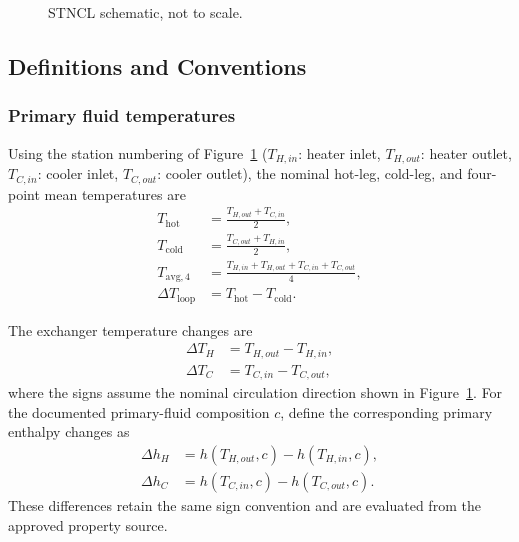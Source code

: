 \documentclass[11pt]{article}
\newcommand{\Tavg}{T_{\mathrm{avg},4}}
\newcommand{\Thot}{T_{\mathrm{hot}}}
\newcommand{\Tcold}{T_{\mathrm{cold}}}
\begin{document}
\begin{figure}[H]
\caption{STNCL schematic, not to scale.}
\label{fig:schematic}
\end{figure}

\subsection{Definitions and Conventions}

\subsubsection{Primary fluid temperatures}
\label{sec:def_temps}

Using the station numbering of Figure~\ref{fig:schematic} ($T_{H,in}$: heater inlet, $T_{H,out}$: heater outlet, $T_{C,in}$: cooler inlet, $T_{C,out}$: cooler outlet), the nominal hot-leg, cold-leg, and four-point mean temperatures are
\begin{align}
\Thot &= \frac{T_{H,out}+T_{C,in}}{2}, \\
\Tcold &= \frac{T_{C,out}+T_{H,in}}{2}, \\
\Tavg &= \frac{T_{H,in}+T_{H,out}+T_{C,in}+T_{C,out}}{4}, \\
\Delta T_{\mathrm{loop}} &= \Thot-\Tcold.
\end{align}

The exchanger temperature changes are
\begin{align}
\Delta T_H &= T_{H,out}-T_{H,in}, \\
\Delta T_C &= T_{C,in}-T_{C,out},
\end{align}
where the signs assume the nominal circulation direction shown in Figure~\ref{fig:schematic}. For the documented primary-fluid composition $c$, define the corresponding primary enthalpy changes as
\begin{align}
\Delta h_H &= h(T_{H,out},c)-h(T_{H,in},c), \\
\Delta h_C &= h(T_{C,in},c)-h(T_{C,out},c).
\end{align}
These differences retain the same sign convention and are evaluated from the approved property source.
\end{document}
